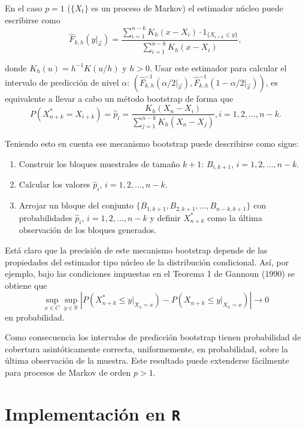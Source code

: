 \documentclass[
]{book}
\theoremstyle{definition}
\theoremstyle{definition}
\theoremstyle{definition}
\theoremstyle{remark}
\begin{document}
En el caso \(p=1\) (\(\{X_{t}\}\) es un proceso de Markov) el estimador
núcleo puede escribirse
como\[\widehat{F}_{k,h}(y|_{\vec{x}})=\frac{\sum_{i=1}^{n-k}K_{h}(x-X_i)\cdot
1_{\{X_{i+k}\leq y\}}}{\sum_{i=1}^{n-k}K_{h}(x-X_i)},\]

donde \(K_{h}(u)=h^{-1}K(u/h)\) y \(h>0\). Usar este estimador para calcular
el intervalo de predicción de nivel \(\alpha\): \(\left( \widehat{F} _{k,h}^{-1}(\alpha /2|_{\vec{x}}),\widehat{F}_{k,h}^{-1}(1-\alpha /2|_{\vec{x }}) \right)\), es equivalente a llevar a cabo un método bootstrap de
forma
que\[P\left( X_{n+k}^{\ast}=X_{i+k} \right) =\widehat{p}_i=\frac{
K_{h}(X_n-X_i)}{\sum_{j=1}^{n-k}K_{h}(X_n-X_j)}\mathrm{,}
i=1,2,\ldots ,n-k.\]

Teniendo esto en cuenta ese mecanismo bootstrap puede describirse como
sigue:

\begin{enumerate}
\def\labelenumi{\arabic{enumi}.}
\item
  Construir los bloques muestrales de tamaño \(k+1\): \(B_{i,k+1}\),
  \(i=1,2,\ldots ,n-k\).
\item
  Calcular los valores \(\widehat{p}_i\), \(i=1,2,\ldots ,n-k\).
\item
  Arrojar un bloque del conjunto \(\{B_{1,k+1},B_{2,k+1},\ldots ,B_{n-k,k+1}\}\) con probabilidades \(\widehat{p}_i\),
  \(i=1,2,\ldots ,n-k\) y definir \(X_{n+k}^{\ast}\) como la última
  observación de los bloques generados.
\end{enumerate}

Está claro que la precisión de este mecanismo bootstrap depende de las
propiedades del estimador tipo núcleo de la distribución condicional.
Así, por ejemplo, bajo las condiciones impuestas en el Teorema 1 de
Gannoun (1990) se obtiene que
\[\sup_{x\in C}\sup_{y\in \mathbb{R}}\left\vert P\left( X_{n+k}^{\ast}\leq
y|_{X_n=x} \right) -P\left( X_{n+k}\leq y|_{X_n=x} \right) \right\vert
\rightarrow 0\]
en probabilidad.

Como consecuencia los intervalos de predicción bootstrap tienen
probabilidad de cobertura asintóticamente correcta, uniformemente, en
probabilidad, sobre la última observación de la muestra. Este resultado
puede extenderse fácilmente para procesos de Markov de orden
\(p>1\).

\hypertarget{implementaciuxf3n-en-r}{%
\section{\texorpdfstring{Implementación en \texttt{R}}{Implementación en R}}\label{implementaciuxf3n-en-r}}
\end{document}
